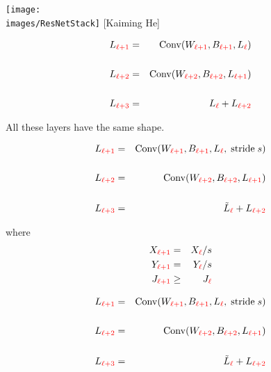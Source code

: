 {

\centerline{\texttt{[image: \\images/ResNetStack]} {\large [Kaiming He]}}


\medskip
\begin{eqnarray*}
L_{\color{red} \ell+1} & = & \mathrm{Conv}(W_{\color{red} \ell+1},B_{\color{red} \ell+1},L_{\color{red} \ell}) \\
\\
L_{\color{red} \ell+2} & = & \mathrm{Conv}(W_{\color{red} \ell+2},B_{\color{red} \ell+2},L_{\color{red} \ell+1}) \\
\\
L_{\color{red} \ell+3} & = & L_{\color{red} \ell} + L_{\color{red} \ell+2}
\end{eqnarray*}

\vfill All these layers have the same shape.


\medskip
\begin{eqnarray*}
L_{\color{red} \ell+1} & = & \mathrm{Conv}(W_{\color{red} \ell+1},B_{\color{red} \ell+1},L_{\color{red} \ell},\;\mathrm{stride} \;s) \\
\\
L_{\color{red} \ell+2} & = & \mathrm{Conv}(W_{\color{red} \ell+2},B_{\color{red} \ell+2},L_{\color{red} \ell+1}) \\
\\
L_{\color{red} \ell+3} & = & \tilde{L}_{\color{red} \ell} + L_{\color{red} \ell+2}
\end{eqnarray*}

\vfill
where
\begin{eqnarray*}
X_{\color{red} \ell+1} & = & X_{\color{red} \ell}/s \\
Y_{\color{red} \ell+1} & = & Y_{\color{red} \ell}/s \\
J_{\color{red} \ell+1} & \geq &  J_{\color{red} \ell}
\end{eqnarray*}


\medskip
\begin{eqnarray*}
L_{\color{red} \ell+1} & = & \mathrm{Conv}(W_{\color{red} \ell+1},B_{\color{red} \ell+1},L_{\color{red} \ell},\;\mathrm{stride} \;s) \\
\\
L_{\color{red} \ell+2} & = & \mathrm{Conv}(W_{\color{red} \ell+2},B_{\color{red} \ell+2},L_{\color{red} \ell+1}) \\
\\
L_{\color{red} \ell+3} & = & \tilde{L}_{\color{red} \ell} + L_{\color{red} \ell+2}
\end{eqnarray*}

}
